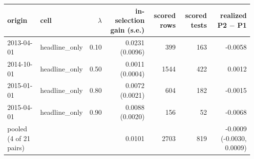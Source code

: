 \begin{tabular}{llrrrrr}
\toprule
origin & cell & $\lambda$ & in-selection gain (s.e.) & scored rows & scored tests & realized P2 $-$ P1 \\
\midrule
2013-04-01 & headline\_only & 0.10 & 0.0231 (0.0096) & 399 & 163 & -0.0058 \\
2014-10-01 & headline\_only & 0.50 & 0.0011 (0.0004) & 1544 & 422 & 0.0012 \\
2015-01-01 & headline\_only & 0.80 & 0.0072 (0.0021) & 604 & 182 & -0.0015 \\
2015-04-01 & headline\_only & 0.90 & 0.0088 (0.0020) & 156 & 52 & -0.0068 \\
\midrule
pooled (4 of 21 pairs) & & & 0.0101 & 2703 & 819 & -0.0009 (-0.0030, 0.0009) \\
\bottomrule
\end{tabular}
